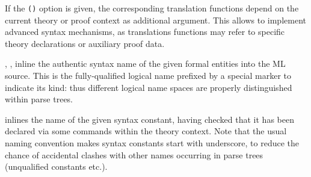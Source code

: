 \begin{isabellebody}
\begin{isamarkuptext}
\begin{description}
  If the \verb|(|\hyperlink{keyword.advanced}{\mbox{}}\verb|)| option is
  given, the corresponding translation functions depend on the current
  theory or proof context as additional argument.  This allows to
  implement advanced syntax mechanisms, as translations functions may
  refer to specific theory declarations or auxiliary proof data.

  \item {}, ,
   inline the authentic syntax name of the
  given formal entities into the ML source.  This is the
  fully-qualified logical name prefixed by a special marker to
  indicate its kind: thus different logical name spaces are properly
  distinguished within parse trees.

  \item {} inlines the name  of
  the given syntax constant, having checked that it has been declared
  via some \hyperlink{command.syntax}{\mbox{}} commands within the theory context.  Note
  that the usual naming convention makes syntax constants start with
  underscore, to reduce the chance of accidental clashes with other
  names occurring in parse trees (unqualified constants etc.).


\end{description}
\end{isamarkuptext}
\end{isabellebody}
